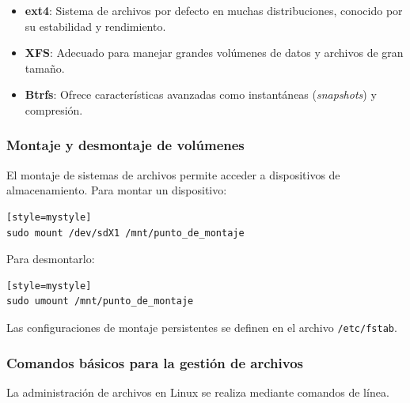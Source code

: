 \begin{itemize}
  \item \textbf{ext4}: Sistema de archivos por defecto en muchas distribuciones, conocido por su estabilidad y rendimiento.
  \item \textbf{XFS}: Adecuado para manejar grandes volúmenes de datos y archivos de gran tamaño.
  \item \textbf{Btrfs}: Ofrece características avanzadas como instantáneas (\textit{snapshots}) y compresión.
\end{itemize}

\subsubsection{Montaje y desmontaje de volúmenes}

El montaje de sistemas de archivos permite acceder a dispositivos de almacenamiento. Para montar un dispositivo:

\begin{lstlisting}[style=mystyle][style=mystyle]
sudo mount /dev/sdX1 /mnt/punto_de_montaje
\end{lstlisting}

Para desmontarlo:

\begin{lstlisting}[style=mystyle][style=mystyle]
sudo umount /mnt/punto_de_montaje
\end{lstlisting}

Las configuraciones de montaje persistentes se definen en el archivo \texttt{/etc/fstab}.

\subsubsection{Comandos básicos para la gestión de archivos}

La administración de archivos en Linux se realiza mediante comandos de línea. 



